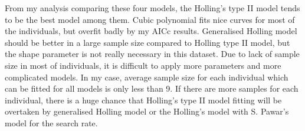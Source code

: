 \documentclass{article}[11pt,a4,twosided,doublespacing,titlepagenumber=on,numbers=endperiod]
\begin{document}
From my analysis comparing these four models, the Holling's type II model tends to be the best model among them. Cubic polynomial fits nice curves for most of the individuals, but overfit badly by my AICc results. Generalised Holling model should be better in a large sample size compared to Holling type II model, but the shape parameter is not really necessary in this dataset. Due to lack of sample size in most of individuals, it is difficult to apply more parameters and more complicated models. In my case, average sample size for each individual which can be fitted for all models is only less than 9. If there are more samples for each individual, there is a huge chance that Holling's type II model fitting will be overtaken by generalised Holling model or the Holling's model with S. Pawar's model\cite{pawar2012dimensionality} for the search rate.


\newpage

%
%
\renewcommand\refname{Bibliography}


\end{document}
